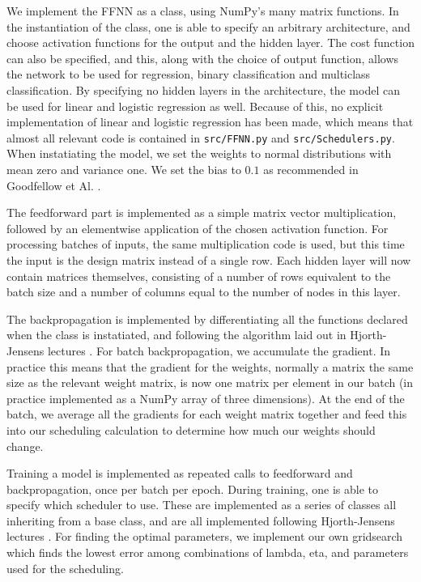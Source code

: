 \documentclass[onecolumn,10pt,cleanfoot]{asme2ej}
\begin{document}
We implement the FFNN as a class, using NumPy's many matrix functions. In the instantiation of the class, one is able to specify an arbitrary architecture, and choose activation functions for the output and the hidden layer. The cost function can also be specified, and this, along with the choice of output function, allows the network to be used for regression, binary classification and multiclass classification. By specifying no hidden layers in the architecture, the model can be used for linear and logistic regression as well. Because of this, no explicit implementation of linear and logistic regression has been made, which means that almost all relevant code is contained in \texttt{src/FFNN.py} and \texttt{src/Schedulers.py}. When instatiating the model, we set the weights to normal distributions with mean zero and variance one. We set the bias to $0.1$ as recommended in Goodfellow et Al. \cite[189]{gbc}.

The feedforward part is implemented as a simple matrix vector multiplication, followed by an elementwise application of the chosen activation function. For processing batches of inputs, the same multiplication code is used, but this time the input is the design matrix instead of a single row. Each hidden layer will now contain matrices themselves, consisting of a number of rows equivalent to the batch size and a number of columns equal to the number of nodes in this layer.

The backpropagation is implemented by differentiating all the functions declared when the class is instatiated, and following the algorithm laid out in Hjorth-Jensens lectures \cite{morten}. For batch backpropagation, we accumulate the gradient. In practice this means that the gradient for the weights, normally a matrix the same size as the relevant weight matrix, is now one matrix per element in our batch (in practice implemented as a NumPy array of three dimensions). At the end of the batch, we average all the gradients for each weight matrix together and feed this into our scheduling calculation to determine how much our weights should change.

Training a model is implemented as repeated calls to feedforward and backpropagation, once per batch per epoch. During training, one is able to specify which scheduler to use. These are implemented as a series of classes all inheriting from a base class, and are all implemented following Hjorth-Jensens lectures \cite{mortensched}. For finding the optimal parameters, we implement our own gridsearch which finds the lowest error among combinations of lambda, eta, and parameters used for the scheduling.
\end{document}

